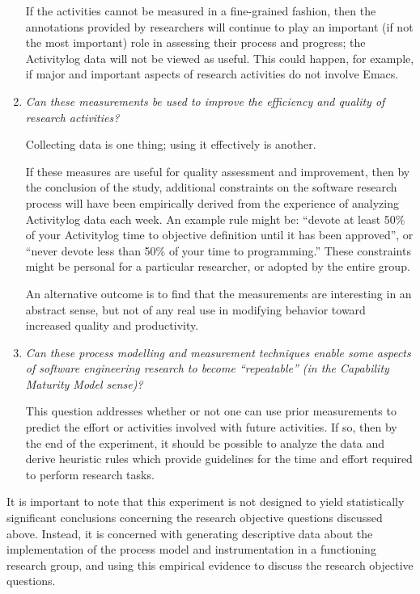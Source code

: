 \begin{enumerate}
  If the activities cannot be measured in a fine-grained fashion, then the
  annotations provided by researchers will continue to play an important
  (if not the most important) role in assessing their process and progress;
  the Activitylog data will not be viewed as useful.  This could happen,
  for example, if major and important aspects of research activities do not
  involve Emacs. 
 

\item {\em Can these measurements be used to improve the efficiency and 
quality of research activities?}

  Collecting data is one thing; using it effectively is another.  
  
  If these measures are useful for quality assessment and improvement,
  then by the conclusion of the study, additional constraints on the
  software research process will have been empirically derived from the
  experience of analyzing Activitylog data each week.  An example rule
  might be: ``devote at least 50\% of your Activitylog time to objective
  definition until it has been approved'', or ``never devote less than
  50\% of your time to programming.''  These constraints might be
  personal for a particular researcher, or adopted by the entire group.
  
  An alternative outcome is to find that the measurements are interesting
  in an abstract sense, but not of any real use in modifying behavior
  toward increased quality and productivity.


\item {\em Can these process modelling and measurement techniques enable
  some aspects of software engineering research to become ``repeatable''
  (in the Capability Maturity Model sense)?}

  This question addresses whether or not one can use prior measurements to
  predict the effort or activities involved with future activities.  If so,
  then by the end of the experiment, it should be possible to analyze the
  data and derive heuristic rules which provide guidelines for the time and
  effort required to perform research tasks. 
 
\end{enumerate}

It is important to note that this experiment is not designed to yield
statistically significant conclusions concerning the research objective
questions discussed above.  Instead, it is concerned with generating
descriptive data about the implementation of the process model and
instrumentation in a functioning research group, and using this
empirical evidence to discuss the research objective questions.

